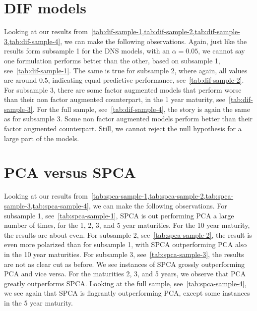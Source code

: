 \section{DIF models}
Looking at our results from~\cref{tab:dif-sample-1,tab:dif-sample-2,tab:dif-sample-3,tab:dif-sample-4}, we can make the following observations. 
Again, just like the results form subsample 1 for the DNS models, with an $\alpha = 0.05$, we cannot say one formulation performs better than the other, based on subsample 1, see~\cref{tab:dif-sample-1}. 
The same is true for subsample 2, where again, all values are around $0.5$, indicating equal predictive performance, see~\cref{tab:dif-sample-2}.
For subsample 3, there are some factor augmented models that perform worse than their non factor augmented counterpart, in the 1 year maturity, see~\cref{tab:dif-sample-3}. 
For the full sample, see~\cref{tab:dif-sample-4}, the story is again the same as for subsample 3.
Some non factor augmented models perform better than their factor augmented counterpart. 
Still, we cannot reject the null hypothesis for a large part of the models.

\section{PCA versus SPCA}
Looking at our results from~\cref{tab:spca-sample-1,tab:spca-sample-2,tab:spca-sample-3,tab:spca-sample-4}, we can make the following observations. 
For subsample 1, see~\cref{tab:spca-sample-1}, SPCA is out performing PCA a large number of times, for the 1, 2, 3, and 5 year maturities.
For the 10 year maturity, the results are about even.
For subsample 2, see~\cref{tab:spca-sample-2}, the result is even more polarized than for subsample 1, with SPCA outperforming PCA also in the 10 year maturities.
For subsample 3, see~\cref{tab:spca-sample-3}, the results are not as clear cut as before.
We see instances of SPCA grossly outperforming PCA and vice versa. 
For the maturities 2, 3, and 5 years, we observe that PCA greatly outperforms SPCA. 
Looking at the full sample, see~\cref{tab:spca-sample-4}, we see again that SPCA is flagrantly outperforming PCA, except some instances in the 5 year maturity. 
